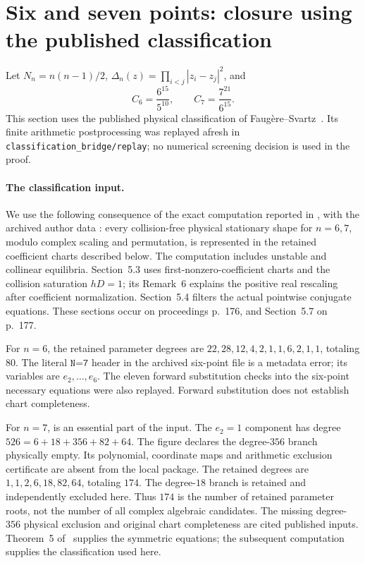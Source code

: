\documentclass[11pt,a4paper]{article}
\theoremstyle{remark}
\begin{document}
\section{Six and seven points: closure using the published classification}
\label{sec:classification-bridge67}

Let $N_n=n(n-1)/2$, $\Delta_n(z)=\prod_{i<j}|z_i-z_j|^2$, and
\[
 C_6=\frac{6^{15}}{5^{10}},\qquad C_7=\frac{7^{21}}{6^{15}}.
\]
This section uses the published physical classification of
Faug\`ere--Svartz~\cite{FS}. Its finite arithmetic postprocessing was
replayed afresh in \texttt{classification\_bridge/replay}; no numerical
screening decision is used in the proof.

\paragraph{The classification input.}
We use the following consequence of the exact computation reported in
\cite[Sections~5.3--5.7]{FS}, with the archived author data
\cite{FSdata,FSdataSeven}: every collision-free physical stationary shape
for $n=6,7$, modulo complex scaling and permutation, is represented in
the retained coefficient charts described below. The computation includes
unstable and collinear equilibria. Section~5.3 uses first-nonzero-coefficient
charts and the collision saturation $hD=1$; its Remark~6 explains the
positive real rescaling after coefficient normalization. Section~5.4
filters the actual pointwise conjugate equations. These sections occur on
proceedings p.~176, and Section~5.7 on p.~177.

For $n=6$, the retained parameter degrees are
$22,28,12,4,2,1,1,6,2,1,1$, totaling $80$.
The literal $\texttt{N=7}$ header in the archived six-point file is a
metadata error; its variables are $e_2,\ldots,e_6$. The eleven forward
substitution checks into the six-point necessary equations were also
replayed. Forward substitution does not establish chart completeness.

For $n=7$, \cite[Section~7, Figure~4, p.~178]{FS} is an essential part of
the input. The $e_2=1$ component has degree
$526=6+18+356+82+64$. The figure declares the degree-$356$ branch physically
empty. Its polynomial, coordinate maps and arithmetic exclusion certificate
are absent from the local package. The retained degrees are
$1,1,2,6,18,82,64$, totaling $174$. The degree-$18$ branch is retained and
independently excluded here. Thus $174$ is the number of retained parameter
roots, not the number of all complex algebraic candidates. The missing
degree-$356$ physical exclusion and original chart completeness are cited
published inputs. Theorem~5 of~\cite{FS} supplies the symmetric equations;
the subsequent computation supplies the classification used here.
\end{document}
